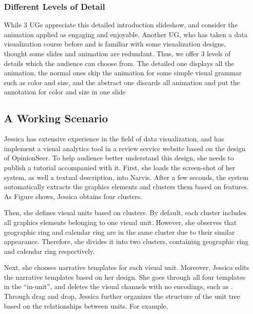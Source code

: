 \subsubsection{Different Levels of Detail}
While 3 UGs appreciate this detailed introduction slideshow, and consider the animation applied as engaging and enjoyable. Another UG, who has taken a data visualization course before and is familiar with some visualization designs, thought some slides and animation are redundant. 
Thus, we offer 3 levels of details which the audience can choose from. The detailed one displays all the animation, the normal ones skip the animation for some simple visual grammar such as color and size, and the abstract one discards all animation and put the annotation for color and size in one slide
    
\subsection{A Working Scenario}
Jessica has extensive experience in the field of data visualization, and has implement a visual analytics tool in a review service website based on the design of OpinionSeer\cite{wu_opinionseer:_2010}. To help audience better understand this design, she needs to publish a tutorial accompanied with it.
First, she loads the screen-shot of her system, as well a textual description, into Narvis.
After a few seconds, the system automatically extracts the graphics elements and clusters them based on features. As Figure shows, Jessica obtains four clusters. 

Then, she defines visual units based on clusters. By default, each cluster includes all graphics elements belonging to one visual unit. However, she observes that geographic ring and calendar ring are in the same cluster due to their similar appearance. Therefore, she divides it into two clusters, containing geographic ring and calendar ring respectively.

Next, she chooses narrative templates for each visual unit. 
Moreover, Jessica edits the narrative templates based on her design. 
She goes through all four templates in the ``in-unit'', and deletes the visual channels with no encodings, such as . 
Through drag and drop, Jessica further organizes the structure of the unit tree based on the relationships between units. For example, 

